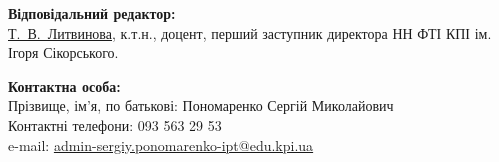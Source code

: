 \documentclass[12pt,a4paper]{article}
\begin{document}
\noindent\textbf{Відповідальний редактор:}\\[1ex]
\href{https://is.ipt.kpi.ua/is/litvinovatv/}{Т.~В.~Литвинова}, к.т.н.,
				доцент, перший заступник директора НН ФТІ КПІ ім. Ігоря Сікорського.

\vspace{1.5em}

\noindent\textbf{Контактна особа:}\\[1ex]
Прізвище, ім'я, по батькові: Пономаренко Сергій Миколайович\\
Контактні телефони: 093 563 29 53\\
e-mail: \href{mailto:admin-sergiy.ponomarenko-ipt@edu.kpi.ua}{admin-sergiy.ponomarenko-ipt@edu.kpi.ua}
\end{document}
